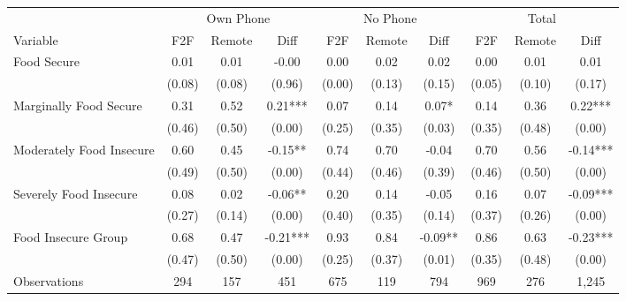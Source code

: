 \begin{tabular}{l*{9}c}
\hline\hline
 & \multicolumn{3}{c}{Own Phone} & \multicolumn{3}{c}{No Phone} & \multicolumn{3}{c}{Total}\\ 
Variable & F2F & Remote & Diff & F2F & Remote & Diff & F2F & Remote & Diff \\
\hline
Food Secure&0.01&0.01&-0.00&0.00&0.02&0.02&0.00&0.01&0.01\\
&(0.08)&(0.08)&(0.96)&(0.00)&(0.13)&(0.15)&(0.05)&(0.10)&(0.17)\\
Marginally Food Secure&0.31&0.52&0.21***&0.07&0.14&0.07*&0.14&0.36&0.22***\\
&(0.46)&(0.50)&(0.00)&(0.25)&(0.35)&(0.03)&(0.35)&(0.48)&(0.00)\\
Moderately Food Insecure&0.60&0.45&-0.15**&0.74&0.70&-0.04&0.70&0.56&-0.14***\\
&(0.49)&(0.50)&(0.00)&(0.44)&(0.46)&(0.39)&(0.46)&(0.50)&(0.00)\\
Severely Food Insecure&0.08&0.02&-0.06**&0.20&0.14&-0.05&0.16&0.07&-0.09***\\
&(0.27)&(0.14)&(0.00)&(0.40)&(0.35)&(0.14)&(0.37)&(0.26)&(0.00)\\
Food Insecure Group&0.68&0.47&-0.21***&0.93&0.84&-0.09**&0.86&0.63&-0.23***\\
&(0.47)&(0.50)&(0.00)&(0.25)&(0.37)&(0.01)&(0.35)&(0.48)&(0.00)\\
\hline
Observations & 294 & 157 & 451 & 675 & 119 & 794 & 969 & 276 & 1,245 \\
\hline\hline
\end{tabular}
